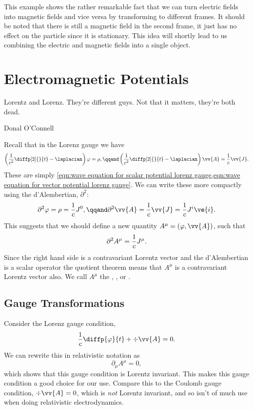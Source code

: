 This example shows the rather remarkable fact that we can turn electric fields into magnetic fields and vice versa by transforming to different frames.
It should be noted that there is still a magnetic field in the second frame, it just has no effect on the particle since it is stationary.
This idea will shortly lead to us combining the electric and magnetic fields into a single object.

\section{Electromagnetic Potentials}
\epigraph{Lorentz and Lorenz. They're different guys. Not that it matters, they're both dead.}{Donal O'Connell}
Recall that in the Lorenz gauge we have
\begin{equation}
    \left( \frac{1}{c^2}\diffp[2]{}{t} - \laplacian \right)\varphi = \rho, \qqand \left( \frac{1}{c^2}\diffp[2]{}{t} - \laplacian \right)\vv{A} = \frac{1}{c}\vv{J}.
\end{equation}
These are simply \cref{eqn:wave equation for scalar potential lorenz gauge,eqn:wave equation for vector potential lorenz gauge}.
We can write these more compactly using the d'Alembertian, \(\partial^2\):
\begin{equation}
    \dalembertian \varphi = \rho = \frac{1}{c}J^0, \qqand \dalembertian \vv{A} = \frac{1}{c}\vv{J} = \frac{1}{c}J^i\ve{i}.
\end{equation}
This suggests that we should define a new quantity \(A^\mu = (\varphi, \vv{A})\), such that
\begin{equation}\label{eqn:wave operator on potential gives current}
    \partial^2 A^\mu = \frac{1}{c}J^\mu.
\end{equation}
Since the right hand side is a contravariant Lorentz vector and the d'Alembertian is a scalar operator the quotient theorem means that \(A^\mu\) is a contravariant Lorentz vector also.
We call \(A^\mu\) the , , or .

\subsection{Gauge Transformations}
Consider the Lorenz gauge condition,
\begin{equation}
    \frac{1}{c}\diffp{\varphi}{t} + \div\vv{A} = 0.
\end{equation}
We can rewrite this in relativistic notation as
\begin{equation}
    \partial_\mu A^\mu = 0,
\end{equation}
which shows that this gauge condition is Lorentz invariant.
This makes this gauge condition a good choice for our use.
Compare this to the Coulomb gauge condition, \(\div\vv{A} = 0\), which is \emph{not} Lorentz invariant, and so isn't of much use when doing relativistic electrodynamics.

